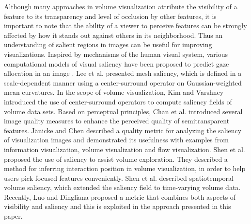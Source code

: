 \documentclass{egpubl}
\begin{document}
Although many approaches in volume visualization attribute the visibility of a feature to its transparency and level of occlusion by other features, it is important to note that the ability of a viewer to perceive features can be strongly affected by how it stands out against others in its neighborhood. Thus an understanding of salient regions in images \cite{zhao_learning_2013} can be useful for improving visualizations.
Inspired by mechanisms of the human visual system, various computational models of visual saliency have been proposed to predict gaze allocation in an image \cite{itti_model_1998} \cite{harel_graph-based_2006}.
Lee et al. \cite{lee_mesh_2005} presented mesh saliency, which is defined in a scale-dependent manner using a center-surround operator on Gaussian-weighted mean curvatures.
In the scope of volume visualization, Kim and Varshney \cite{kim_saliency-guided_2006} introduced the use of center-surround operators to compute saliency fields of volume data sets.
Based on perceptual principles, Chan et al. \cite{chan_perception-based_2009} introduced several image quality measures to enhance the perceived quality of semitransparent features.
J{\"a}nicke and Chen \cite{janicke_salience-based_2010} described a quality metric for analyzing the saliency of visualization images and demonstrated its usefulness with examples from information visualization, volume visualization and flow visualization.
Shen et al. \cite{shen_save:_2014} proposed the use of saliency to assist volume exploration. They described a method for inferring interaction position in volume visualization, in order to help users pick focused features conveniently.
Shen et al. \cite{shen_spatiotemporal_2015} described spatiotemporal volume saliency, which extended the saliency field \cite{kim_saliency-guided_2006} to time-varying volume data. Recently, Luo and Dingliana \cite{luo_visibility-weighted_2015} proposed a metric that combines both aspects of visibility and saliency and this is exploited in the approach presented in this paper.  

\end{document}
